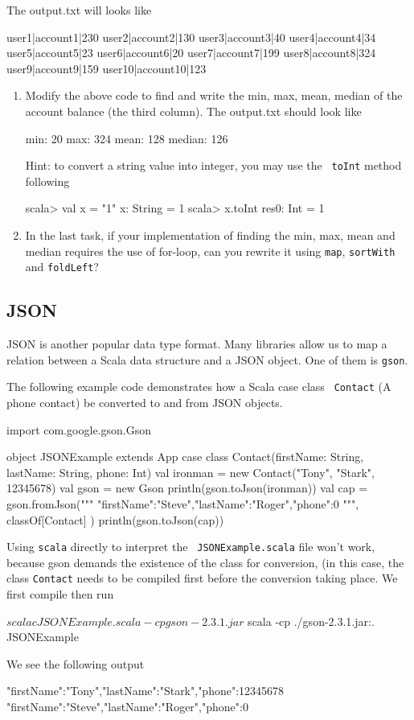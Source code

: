 \documentclass[10pt]{article}
\begin{document}
The output.txt will looks like
\begin{code}
user1|account1|230
user2|account2|130
user3|account3|40
user4|account4|34
user5|account5|23
user6|account6|20
user7|account7|199
user8|account8|324
user9|account9|159
user10|account10|123
\end{code}


\begin{enumerate}
 \item  Modify the above code to find and write the min, max, mean,
   median of the account balance (the third column). The output.txt
   should look like
\begin{code}
min: 20
max: 324
mean: 128
median: 126
\end{code}
  Hint: to convert a string value into integer, you may use the {\tt
    toInt} method
  following
\begin{code}
scala> val x = "1"
x: String = 1
scala> x.toInt
res0: Int = 1
\end{code}
 \item In the last task, if your implementation of finding the min,
   max, mean and median requires the use of for-loop, can you rewrite
   it using {\tt map}, {\tt sortWith} and {\tt foldLeft}?
\end{enumerate}


\subsection{JSON}

JSON is another popular data type format. Many libraries allow us to map a relation between a
Scala data structure and a JSON object. One of them is {\tt gson}.

The following example code demonstrates how a Scala case class {\tt
  Contact} (A phone contact) be converted to and from JSON objects.

\begin{code}
import com.google.gson.Gson

object JSONExample extends App {
    case class Contact(firstName: String, lastName: String, phone: Int)
    val ironman = new Contact("Tony", "Stark", 12345678)
    val gson = new Gson
    println(gson.toJson(ironman))
    val cap = gson.fromJson("""
        {"firstName":"Steve","lastName":"Roger","phone":0}
    """, classOf[Contact]
    )
    println(gson.toJson(cap))
}
\end{code}

Using {\tt scala} directly to interpret the {\tt
  JSONExample.scala} file won't work, because gson demands the existence of the
class for conversion, (in this case, the class {\tt Contact} needs to
be compiled first before the conversion taking place. We first compile
then run
\begin{code}
  $ scalac JSONExample.scala  -cp gson-2.3.1.jar
  $ scala -cp ./gson-2.3.1.jar:. JSONExample
\end{code}
We see the following output
\begin{code}
{"firstName":"Tony","lastName":"Stark","phone":12345678}
{"firstName":"Steve","lastName":"Roger","phone":0}
\end{code}
\end{document}

